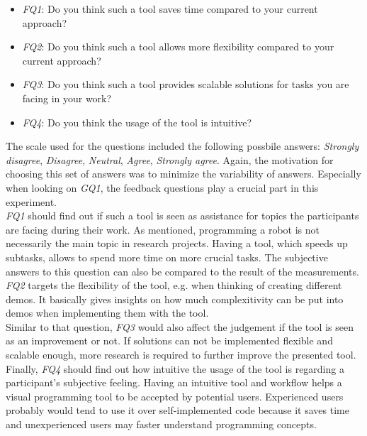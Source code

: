 \begin{itemize}
    \item \textit{FQ1}: Do you think such a tool saves time compared to your current approach?
    \item \textit{FQ2}: Do you think such a tool allows more flexibility compared to your current approach?
    \item \textit{FQ3}: Do you think such a tool provides scalable solutions for tasks you are facing in your work?
    \item \textit{FQ4}: Do you think the usage of the tool is intuitive?
\end{itemize}
The scale used for the questions included the following possbile answers: \textit{Strongly disagree}, \textit{Disagree}, \textit{Neutral}, \textit{Agree}, \textit{Strongly agree}. Again, the motivation for choosing this set of answers was to minimize the variability of answers. Especially when looking on \textit{GQ1}, the feedback questions play a crucial part in this experiment. \\

\textit{FQ1} should find out if such a tool is seen as assistance for topics the participants are facing during their work. As mentioned, programming a robot is not necessarily the main topic in research projects. Having a tool, which speeds up subtasks, allows to spend more time on more crucial tasks. The subjective answers to this question can also be compared to the result of the measurements. \\

\textit{FQ2} targets the flexibility of the tool, e.g. when thinking of creating different demos. It basically gives insights on how much complexitivity can be put into demos when implementing them with the tool. \\

Similar to that question, \textit{FQ3} would also affect the judgement if the tool is seen as an improvement or not. If solutions can not be implemented flexible and scalable enough, more research is required to further improve the presented tool. \\

Finally, \textit{FQ4} should find out how intuitive the usage of the tool is regarding a participant's subjective feeling. Having an intuitive tool and workflow helps a visual programming tool to be accepted by potential users. Experienced users probably would tend to use it over self-implemented code because it saves time and unexperienced users may faster understand programming concepts.

